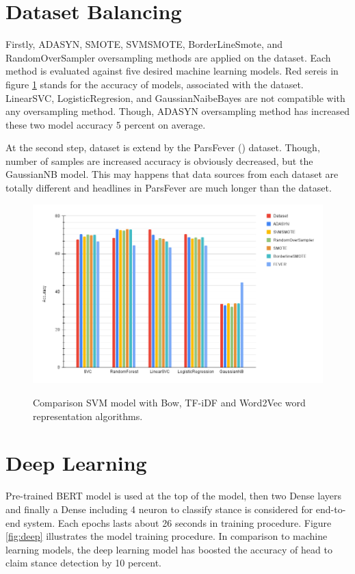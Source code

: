 \section{Dataset Balancing}
Firstly, ADASYN, SMOTE, SVMSMOTE, BorderLineSmote, and RandomOverSampler oversampling methods are applied on the \cite{stance_persian} dataset. Each method is evaluated against five desired machine learning models. Red sereis in figure \ref{fig:balanc} stands for the accuracy of models, associated with the \cite{stance_persian} dataset. LinearSVC, LogisticRegresion, and GaussianNaibeBayes are not compatible with any oversampling method. Though, ADASYN oversampling method has increased these two model accuracy 5 percent on average. 

At the second step, dataset is extend by the ParsFever (\cite{parsfever}) dataset. Though, number of samples are increased accuracy is obviously decreased, but the GaussianNB model. This may happens that data sources from each dataset are totally different and headlines in ParsFever are much longer than the \cite{stance_persian} dataset.
\begin{figure}%
	\centering
	{\includegraphics[width=14.5cm]{statistics/balancing.png} }
	\caption{Comparison SVM model with Bow, TF-iDF and Word2Vec word representation algorithms.}%
	\label{fig:balanc}%
\end{figure}

\section{Deep Learning}
Pre-trained BERT model is used at the top of the model, then two Dense layers and finally a Dense including 4 neuron to classify stance is considered for end-to-end system. Each epochs lasts about 26 seconds in training procedure. Figure \ref{fig:deep} illustrates the model training procedure. In comparison to machine learning models, the deep learning model has boosted the accuracy of head to claim stance detection by 10 percent. 

